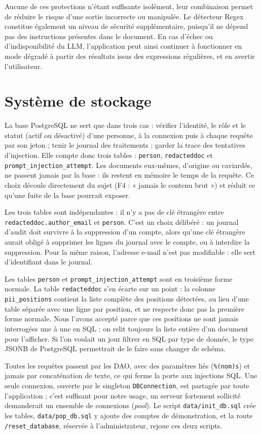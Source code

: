 \documentclass[12pt,a4paper]{article}
\begin{document}
Aucune de ces protections n'étant suffisante isolément, leur combinaison permet de réduire le risque d'une sortie incorrecte ou manipulée. Le détecteur Regex constitue également un niveau de sécurité supplémentaire, puisqu'il ne dépend pas des instructions présentes dans le document. En cas d'échec ou d'indisponibilité du LLM, l'application peut ainsi continuer à fonctionner en mode dégradé à partir des résultats issus des expressions régulières, et en avertir l’utilisateur.
\section{Système de stockage}

La base PostgreSQL ne sert que dans trois cas : vérifier l'identité, le rôle et le statut (actif ou désactivé) d'une personne, à la connexion puis à chaque requête par son jeton ; tenir le journal des traitements ; garder la trace des tentatives d'injection. Elle compte donc trois tables : \texttt{person}, \texttt{redacteddoc} et \texttt{prompt\_injection\_attempt}. Les documents eux-mêmes, d'origine ou caviardés, ne passent jamais par la base : ils restent en mémoire le temps de la requête. Ce choix découle directement du sujet (F4 : « jamais le contenu brut ») et réduit ce qu'une fuite de la base pourrait exposer.

Les trois tables sont indépendantes : il n'y a pas de clé étrangère entre \texttt{redacteddoc.author\_email} et \texttt{person}. C'est un choix délibéré : un journal d'audit doit survivre à la suppression d'un compte, alors qu'une clé étrangère aurait obligé à supprimer les lignes du journal avec le compte, ou à interdire la suppression. Pour la même raison, l'adresse e-mail n'est pas modifiable : elle sert d'identifiant dans le journal.

Les tables \texttt{person} et \texttt{prompt\_injection\_attempt} sont en troisième forme normale. La table \texttt{redacteddoc} s'en écarte sur un point : la colonne \texttt{pii\_positions} contient la liste complète des positions détectées, au lieu d'une table séparée avec une ligne par position, et ne respecte donc pas la première forme normale. Nous l'avons accepté parce que ces positions ne sont jamais interrogées une à une en SQL : on relit toujours la liste entière d'un document pour l'afficher. Si l'on voulait un jour filtrer en SQL par type de donnée, le type JSONB de PostgreSQL permettrait de le faire sans changer de schéma.

Toutes les requêtes passent par les DAO, avec des paramètres liés (\texttt{\%(nom)s}) et jamais par concaténation de texte, ce qui ferme la porte aux injections SQL. Une seule connexion, ouverte par le singleton \texttt{DBConnection}, est partagée par toute l'application ; c'est suffisant pour notre usage, un serveur fortement sollicité demanderait un ensemble de connexions (\textit{pool}). Le script \texttt{data/init\_db.sql} crée les tables, \texttt{data/pop\_db.sql} y ajoute des comptes de démonstration, et la route \texttt{/reset\_database}, réservée à l'administrateur, rejoue ces deux scripts.
\end{document}
